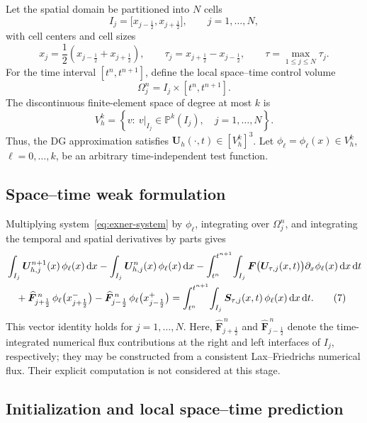 \documentclass[11pt]{article}
\newcommand{\dt}{\,\mathrm{d}t}
\newcommand{\dx}{\,\mathrm{d}x}
\begin{document}
Let the spatial domain be partitioned into \(N\) cells
\[
    I_j=\bigl[x_{j-\frac12},x_{j+\frac12}\bigr],
    \qquad j=1,\ldots,N,
\]
with cell centers and cell sizes
\[
    x_j=\frac12\left(x_{j-\frac12}+x_{j+\frac12}\right),
    \qquad
    \tau_j=x_{j+\frac12}-x_{j-\frac12},
    \qquad
    \tau=\max_{1\leq j\leq N}\tau_j.
\]
For the time interval \([t^n,t^{n+1}]\), define the local space--time control
volume
\[
    \Omega_j^n=I_j\times[t^n,t^{n+1}].
\]
The discontinuous finite-element space of degree at most \(k\) is
\[
    V_h^k
    =\left\{
        v:\ v\big|_{I_j}\in\mathbb P^k(I_j),
        \quad j=1,\ldots,N
      \right\}.
\]
Thus, the DG approximation satisfies
\(\bm U_h(\cdot,t)\in[V_h^k]^3\). Let
\(\phi_\ell=\phi_\ell(x)\in V_h^k\), \(\ell=0,\ldots,k\), be an arbitrary
time-independent test function.

\subsection{Space--time weak formulation}

Multiplying system~\eqref{eq:exner-system} by \(\phi_\ell\), integrating over
\(\Omega_j^n\), and integrating the temporal and spatial derivatives by parts
gives
\begin{align}
    &\int_{I_j}
        \bm U_{h,j}^{n+1}(x)\,\phi_\ell(x)\dx
    -
    \int_{I_j}
        \bm U_{h,j}^{n}(x)\,\phi_\ell(x)\dx     - \int_{t^n}^{t^{n+1}}\!\int_{I_j}
        \bm F\bigl(\bm U_{\tau,j}(x,t)\bigr)
        \partial_x\phi_\ell(x)\dx\dt
    \notag\\
    &\quad
    +
    \widehat{\bm F}_{j+\frac12}^{\,n}\,
        \phi_\ell\bigl(x_{j+\frac12}^{-}\bigr)
    -
    \widehat{\bm F}_{j-\frac12}^{\,n}\,
        \phi_\ell\bigl(x_{j-\frac12}^{+}\bigr) =
    \int_{t^n}^{t^{n+1}}\!\int_{I_j}
        \bm S_{\tau,j}(x,t)\,
        \phi_\ell(x)\dx\dt .
    \tag{7}
    \label{eq:ader-dg-weak-form}
\end{align}
This vector identity holds for \(j=1,\ldots,N\). Here,
\(\widehat{\bm F}_{j+\frac12}^{\,n}\) and
\(\widehat{\bm F}_{j-\frac12}^{\,n}\) denote the time-integrated numerical
flux contributions at the right and left interfaces of \(I_j\), respectively;
they may be constructed from a consistent Lax--Friedrichs numerical flux. Their
explicit computation is not considered at this stage.


\subsection{Initialization and local space--time prediction}
\end{document}
